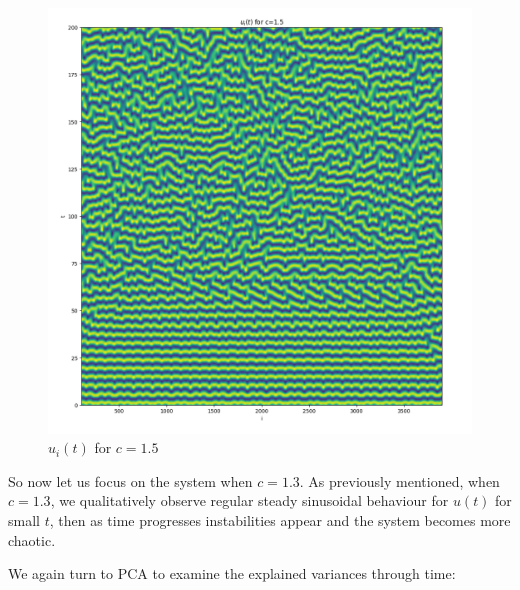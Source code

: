 \documentclass[a4paper, oneside]{book}
\begin{document}
\begin{figure}[htpb]
    \centering
    \includegraphics[width=1.0\textwidth]{./images/Pasted image 20231207120040.png}
    \caption{$u_i(t)$ for $c=1.5$}
\end{figure}

\clearpage

So now let us focus on the system when $c = 1.3$. As previously mentioned,
when $c=1.3$, we qualitatively observe regular steady sinusoidal behaviour for
$u(t)$  for small $t$, then as time progresses instabilities appear and the system becomes
more chaotic.

We again turn to PCA to examine the explained variances through time:
\end{document}
